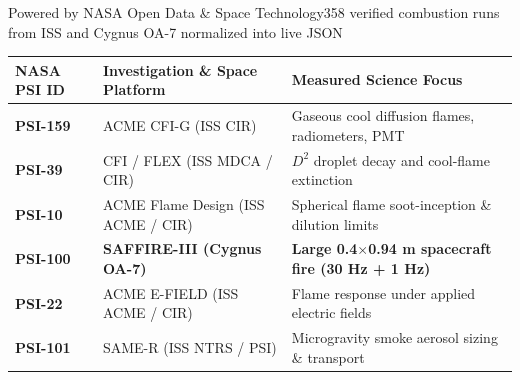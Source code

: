 \documentclass[aspectratio=169,11pt]{beamer}
\begin{document}
\begin{frame}{Powered by NASA Open Data \& Space Technology}{358 verified combustion runs from ISS and Cygnus OA-7 normalized into live JSON}
  \vspace{0.1cm}
  {\scriptsize
  \begin{tabular}{@{}p{2.1cm}p{4.8cm}p{7.2cm}@{}}
    \toprule
    \textbf{\textcolor{AccentCyan}{NASA PSI ID}} & \textbf{\textcolor{TextWhite}{Investigation \& Space Platform}} & \textbf{\textcolor{AccentOrange}{Measured Science Focus}} \\
    \midrule
    \textcolor{AccentCyan}{\textbf{PSI-159}} & ACME CFI-G (ISS \textperiodcentered{} CIR) & Gaseous cool diffusion flames, radiometers, PMT \\
    \textcolor{AccentCyan}{\textbf{PSI-39}}  & CFI / FLEX (ISS \textperiodcentered{} MDCA / CIR) & $D^2$ droplet decay and cool-flame extinction \\
    \textcolor{AccentCyan}{\textbf{PSI-10}}  & ACME Flame Design (ISS \textperiodcentered{} ACME / CIR) & Spherical flame soot-inception \& dilution limits \\
    \textcolor{AccentOrange}{\textbf{PSI-100}} & \textbf{SAFFIRE-III (Cygnus OA-7)} & \textbf{Large 0.4$\times$0.94 m spacecraft fire (30 Hz + 1 Hz)} \\
    \textcolor{AccentCyan}{\textbf{PSI-22}}  & ACME E-FIELD (ISS \textperiodcentered{} ACME / CIR) & Flame response under applied electric fields \\
    \textcolor{AccentCyan}{\textbf{PSI-101}} & SAME-R (ISS \textperiodcentered{} NTRS / PSI) & Microgravity smoke aerosol sizing \& transport \\
    \bottomrule
  \end{tabular}
  }


\end{frame}
\end{document}

